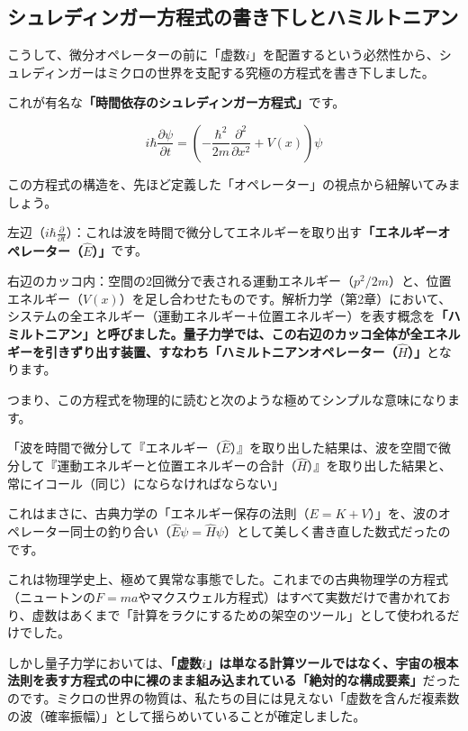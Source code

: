 \subsection{シュレディンガー方程式の書き下しとハミルトニアン}

こうして、微分オペレーターの前に「虚数\(i\)」を配置するという必然性から、シュレディンガーはミクロの世界を支配する究極の方程式を書き下しました。

これが有名な\textbf{「時間依存のシュレディンガー方程式」}です。

\[i\hbar \frac{\partial \psi}{\partial t} = \left( -\frac{\hbar^2}{2m} \frac{\partial^2}{\partial x^2} + V(x) \right) \psi\]

この方程式の構造を、先ほど定義した「オペレーター」の視点から紐解いてみましょう。

左辺（\(i\hbar \frac{\partial}{\partial t}\)）：これは波を時間で微分してエネルギーを取り出す\textbf{「エネルギーオペレーター（\(\hat{E}\)）」}です。

右辺のカッコ内：空間の2回微分で表される運動エネルギー（\(p^2/2m\)）と、位置エネルギー（\(V(x)\)）を足し合わせたものです。解析力学（第2章）において、システムの全エネルギー（運動エネルギー＋位置エネルギー）を表す概念を\textbf{「ハミルトニアン」と呼びました。量子力学では、この右辺のカッコ全体が全エネルギーを引きずり出す装置、すなわち「ハミルトニアンオペレーター（\(\hat{H}\)）」}となります。

つまり、この方程式を物理的に読むと次のような極めてシンプルな意味になります。

「波を時間で微分して『エネルギー（\(\hat{E}\)）』を取り出した結果は、波を空間で微分して『運動エネルギーと位置エネルギーの合計（\(\hat{H}\)）』を取り出した結果と、常にイコール（同じ）にならなければならない」

これはまさに、古典力学の「エネルギー保存の法則（\(E = K + V\)）」を、波のオペレーター同士の釣り合い（\(\hat{E}\psi = \hat{H}\psi\)）として美しく書き直した数式だったのです。

これは物理学史上、極めて異常な事態でした。これまでの古典物理学の方程式（ニュートンの\(F=ma\)やマクスウェル方程式）はすべて実数だけで書かれており、虚数はあくまで「計算をラクにするための架空のツール」として使われるだけでした。

しかし量子力学においては、\textbf{「虚数\(i\)」は単なる計算ツールではなく、宇宙の根本法則を表す方程式の中に裸のまま組み込まれている「絶対的な構成要素」}だったのです。ミクロの世界の物質は、私たちの目には見えない「虚数を含んだ複素数の波（確率振幅）」として揺らめいていることが確定しました。


